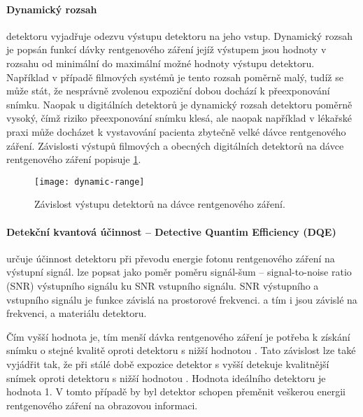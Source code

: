\paragraph{Dynamický rozsah}
detektoru vyjadřuje odezvu výstupu detektoru na jeho vstup. Dynamický rozsah je popsán funkcí dávky rentgenového záření jejíž výstupem jsou hodnoty v rozsahu od minimální do maximální možné hodnoty výstupu detektoru. Například v případě filmových systémů je tento rozsah poměrně malý, tudíž se může stát, že nesprávně zvolenou expoziční dobou dochází k přeexponování snímku. Naopak u digitálních detektorů je dynamický rozsah detektoru poměrně vysoký, čímž riziko přeexponování snímku klesá, ale naopak například v lékařské praxi může docházet k vystavování pacienta zbytečně velké dávce rentgenového záření. Závislosti výstupů filmových a obecných digitálních detektorů na dávce rentgenového záření popisuje \cref{fig:dynamic-range}. \cite[str.~682]{Advances-in-Digital-Radiography}

\begin{figure}[ht]
\centering
\texttt{[image: dynamic-range]}
\caption{Závislost výstupu detektorů na dávce rentgenového záření. \cite[str.~682]{Advances-in-Digital-Radiography}}
\label{fig:dynamic-range}
\end{figure}

\paragraph{Detekční kvantová účinnost -- Detective Quantim Efficiency (DQE)}
určuje účinnost detektoru při převodu energie fotonu rentgenového záření na výstupní signál.  lze popsat jako poměr poměru signál-šum -- signal-to-noise ratio (SNR) výstupního signálu ku SNR vstupního signálu. SNR výstupního a vstupního signálu je funkce závislá na prostorové frekvenci.  a tím i  jsou závislé na frekvenci,  a materiálu detektoru. 

Čím vyšší hodnota  je, tím menší dávka rentgenového záření je potřeba k získání snímku o stejné kvalitě oproti detektoru s nižší hodnotou . Tato závislost lze také vyjádřit tak, že při stálé době expozice detektor s vyšší  detekuje kvalitnější snímek oproti detektoru s nižší hodnotou . Hodnota  ideálního detektoru je hodnota 1. V tomto případě by byl detektor schopen přeměnit veškerou energii rentgenového záření na obrazovou informaci.

